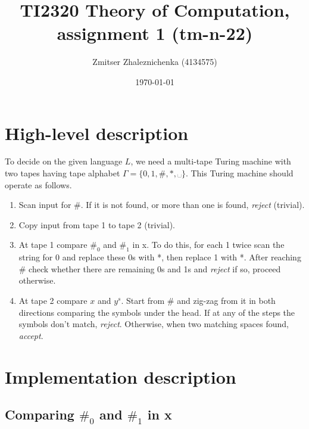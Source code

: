 \documentclass[a4paper, notitlepage]{article}
\begin{document}
\title{TI2320 Theory of Computation, assignment 1 (tm-n-22)} 
\author{Zmitser Zhaleznichenka (4134575)}
\date{\today}
\maketitle

\setcounter{secnumdepth}{0}

\section{High-level description}

To decide on the given language $L$, we need a multi-tape Turing machine with two tapes having tape alphabet $\Gamma = \{0, 1, \#, *, ␣\}$. This Turing machine should operate as follows. 

\begin{enumerate}

\item Scan input for \#. If it is not found, or more than one is found, \emph{reject} (trivial).

\item Copy input from tape 1 to tape 2 (trivial).

\item At tape 1 compare \(\#_0\) and \(\#_1\) in x. To do this, for each 1 twice scan the string for 0 and replace these 0s with *, then replace 1 with *. After reaching \# check whether there are remaining 0s and 1s and \emph{reject} if so, proceed otherwise.

\item At tape 2 compare $x$ and $y^s$. Start from \# and zig-zag from it in both directions comparing the symbols under the head. If at any of the steps the symbols don't match, \emph{reject}. Otherwise, when two matching spaces found, \emph{accept}.

\end{enumerate}

\section{Implementation description}

\subsection{Comparing $\#_0$ and $\#_1$ in x}
\end{document}
